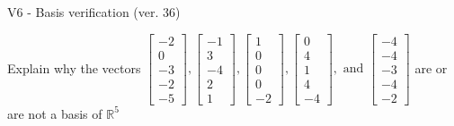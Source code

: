 \begin{exercise}
  \begin{exerciseTitle}V6 - Basis verification (ver. 36)\end{exerciseTitle}
  \begin{exerciseStatement}
    Explain why the vectors \(\left[\begin{array}{r}
-2 \\
0 \\
-3 \\
-2 \\
-5
\end{array}\right] , \left[\begin{array}{r}
-1 \\
3 \\
-4 \\
2 \\
1
\end{array}\right] , \left[\begin{array}{r}
1 \\
0 \\
0 \\
0 \\
-2
\end{array}\right] , \left[\begin{array}{r}
0 \\
4 \\
1 \\
4 \\
-4
\end{array}\right] , \text{ and } \left[\begin{array}{r}
-4 \\
-4 \\
-3 \\
-4 \\
-2
\end{array}\right]\) are or are not a basis of \(\mathbb{R}^5\)	



\end{exerciseStatement}
\end{exercise}
